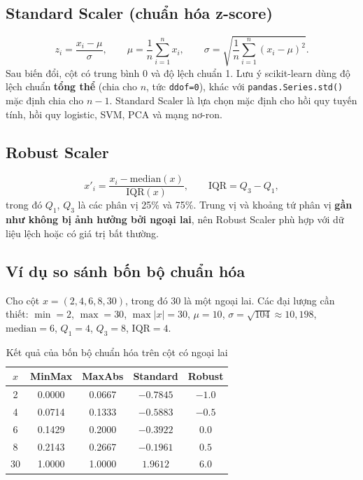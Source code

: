 \subsection{Standard Scaler (chuẩn hóa z-score)}
\begin{equation}
    z_i = \frac{x_i - \mu}{\sigma}, \qquad \mu = \frac{1}{n}\sum_{i=1}^{n} x_i, \qquad \sigma = \sqrt{\frac{1}{n}\sum_{i=1}^{n} (x_i - \mu)^2}.
\end{equation}
Sau biến đổi, cột có trung bình 0 và độ lệch chuẩn 1. Lưu ý scikit-learn dùng độ lệch chuẩn \textbf{tổng thể} (chia cho $n$, tức \texttt{ddof=0}), khác với \texttt{pandas.Series.std()} mặc định chia cho $n-1$. Standard Scaler là lựa chọn mặc định cho hồi quy tuyến tính, hồi quy logistic, SVM, PCA và mạng nơ-ron.

\subsection{Robust Scaler}
\begin{equation}
    x'_i = \frac{x_i - \mathrm{median}(x)}{\mathrm{IQR}(x)}, \qquad \mathrm{IQR} = Q_3 - Q_1,
\end{equation}
trong đó $Q_1$, $Q_3$ là các phân vị 25\% và 75\%. Trung vị và khoảng tứ phân vị \textbf{gần như không bị ảnh hưởng bởi ngoại lai}, nên Robust Scaler phù hợp với dữ liệu lệch hoặc có giá trị bất thường.

\subsection{Ví dụ so sánh bốn bộ chuẩn hóa}

\begin{example}
Cho cột $x = (2, 4, 6, 8, 30)$, trong đó $30$ là một ngoại lai. Các đại lượng cần thiết:
$\min = 2$, $\max = 30$, $\max|x| = 30$, $\mu = 10$, $\sigma = \sqrt{104} \approx 10{,}198$, $\mathrm{median} = 6$, $Q_1 = 4$, $Q_3 = 8$, $\mathrm{IQR} = 4$.
\end{example}

\begin{table}[H]
\centering
\begin{tabular}{|c|c|c|c|c|}
\hline
$x$ & \textbf{MinMax} & \textbf{MaxAbs} & \textbf{Standard} & \textbf{Robust} \\
\hline
2  & 0.0000 & 0.0667 & $-0.7845$ & $-1.0$ \\ \hline
4  & 0.0714 & 0.1333 & $-0.5883$ & $-0.5$ \\ \hline
6  & 0.1429 & 0.2000 & $-0.3922$ & $0.0$ \\ \hline
8  & 0.2143 & 0.2667 & $-0.1961$ & $0.5$ \\ \hline
30 & 1.0000 & 1.0000 & $1.9612$ & $6.0$ \\ \hline
\end{tabular}
\caption{Kết quả của bốn bộ chuẩn hóa trên cột có ngoại lai}
\label{tab:scalers}
\end{table}

